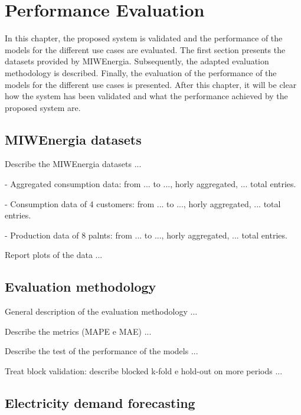 \chapter{Performance Evaluation}
\label{cha:evaluation}
\vspace{0.4 cm}

In this chapter, the proposed system is validated and the performance of the models for the different use cases are evaluated.
The first section presents the datasets provided by MIWEnergia.
Subsequently, the adapted evaluation methodology is described.
Finally, the evaluation of the performance of the models for the different use cases is presented.
After this chapter, it will be clear how the system has been validated and what the performance achieved by the proposed system are.


\section{MIWEnergia datasets}
\label{sec:datasets}
\vspace{0.2 cm}

Describe the MIWEnergia datasets ...

- Aggregated consumption data: from ... to ..., horly aggregated, ... total entries.

- Consumption data of 4 customers: from ... to ..., horly aggregated, ... total entries.

- Production data of 8 palnts: from ... to ..., horly aggregated, ... total entries.

Report plots of the data ...


\section{Evaluation methodology}
\label{sec:methodology}
\vspace{0.2 cm}

General description of the evaluation methodology ...

Describe the metrics (MAPE e MAE) ...

Describe the test of the performance of the models ...

Treat block validation: describe blocked k-fold e hold-out on more periods ...


\section{Electricity demand forecasting}
\label{sec:demandval}
\vspace{0.2 cm}

